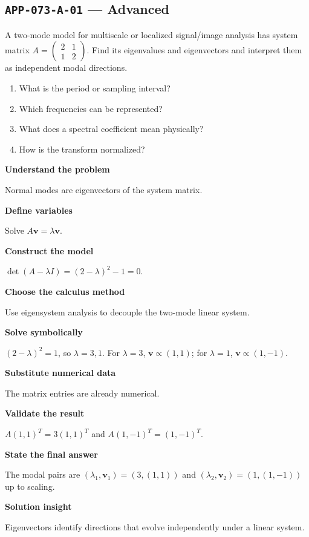 \documentclass[11pt]{book}
\newcommand{\pid}[1]{\texttt{#1}}
\begin{document}
\subsection*{\pid{APP-073-A-01} — Advanced}
\begin{problembox}
A two-mode model for multiscale or localized signal/image analysis has system matrix $A=\begin{pmatrix}2&1\\1&2\end{pmatrix}$. Find its eigenvalues and eigenvectors and interpret them as independent modal directions.
\end{problembox}
\begin{promptbox}\begin{enumerate}
\item What is the period or sampling interval?
\item Which frequencies can be represented?
\item What does a spectral coefficient mean physically?
\item How is the transform normalized?
\end{enumerate}\end{promptbox}
\begin{solutionbox}
\textbf{Understand the problem}\par Normal modes are eigenvectors of the system matrix.\par\medskip
\textbf{Define variables}\par Solve $A\mathbf v=\lambda\mathbf v$.\par\medskip
\textbf{Construct the model}\par $\det(A-\lambda I)=(2-\lambda)^2-1=0$.\par\medskip
\textbf{Choose the calculus method}\par Use eigensystem analysis to decouple the two-mode linear system.\par\medskip
\textbf{Solve symbolically}\par $(2-\lambda)^2=1$, so $\lambda=3,1$. For $\lambda=3$, $\mathbf v\propto(1,1)$; for $\lambda=1$, $\mathbf v\propto(1,-1)$.\par\medskip
\textbf{Substitute numerical data}\par The matrix entries are already numerical.\par\medskip
\textbf{Validate the result}\par $A(1,1)^T=3(1,1)^T$ and $A(1,-1)^T=(1,-1)^T$.\par\medskip
\textbf{State the final answer}\par The modal pairs are $(\lambda_1,\mathbf v_1)=(3,(1,1))$ and $(\lambda_2,\mathbf v_2)=(1,(1,-1))$ up to scaling.\par\medskip
\textbf{Solution insight}\par Eigenvectors identify directions that evolve independently under a linear system.\par\medskip
\end{solutionbox}
\end{document}
